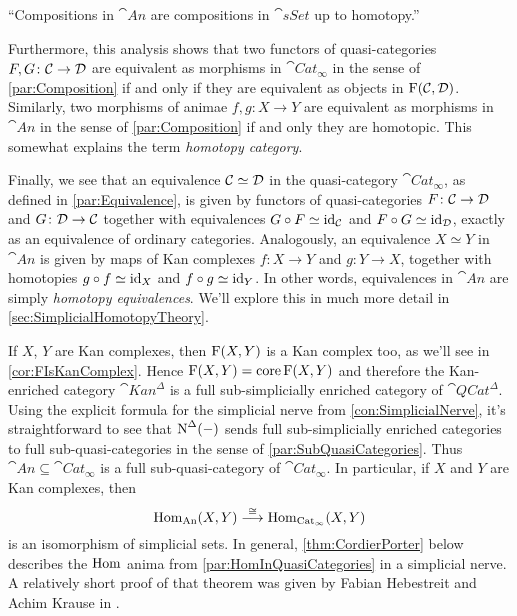 \begin{exm}
\begin{alphanumerate}[label={}]
		\item\enquote{Compositions in $\cat{An}$ are compositions in $\cat{sSet}$ up to homotopy.}
	\end{alphanumerate}
	Furthermore, this analysis shows that two functors of quasi-categories $F,G\colon \mathcal{C}\rightarrow \mathcal{D}$ are equivalent as morphisms in $\cat{Cat}_\infty$ in the sense of \cref{par:Composition} if and only if they are equivalent as objects in $\operatorname{F}(\mathcal{C},\mathcal{D})$. Similarly, two morphisms of animae $f,g\colon X\rightarrow Y$ are equivalent as morphisms in $\cat{An}$ in the sense of \cref{par:Composition} if and only they are homotopic. This somewhat explains the term \emph{homotopy category}.
	
	Finally, we see that an equivalence $\mathcal{C}\simeq \mathcal{D}$ in the quasi-category $\cat{Cat}_\infty$, as defined in \cref{par:Equivalence}, is given by functors of quasi-categories $F\colon \mathcal{C}\rightarrow \mathcal{D}$ and $G\colon \mathcal{D}\rightarrow \mathcal{C}$ together with equivalences $G\circ F\simeq \operatorname{id}_{\mathcal{C}}$ and $F\circ G\simeq \operatorname{id}_{\mathcal{D}}$, exactly as an equivalence of ordinary categories. Analogously, an equivalence $X\simeq Y$ in $\cat{An}$ is given by maps of Kan complexes $f\colon X\rightarrow Y$ and $g\colon Y\rightarrow X$, together with homotopies $g\circ f\simeq\operatorname{id}_X$ and $f\circ g\simeq \operatorname{id}_Y$. In other words, equivalences in $\cat{An}$ are simply \emph{homotopy equivalences}. We'll explore this in much more detail in \cref{sec:SimplicialHomotopyTheory}.
\end{exm}
If $X$, $Y$ are Kan complexes, then $\operatorname{F}(X,Y)$ is a Kan complex too, as we'll see in \cref{cor:FIsKanComplex}. Hence $\operatorname{F}(X,Y)=\operatorname{core}\operatorname{F}(X,Y)$ and therefore the Kan-enriched category $\cat{Kan}^\Delta$ is a full sub-simplicially enriched category of $\cat{QCat}^\Delta$. Using the explicit formula for the simplicial nerve from \cref{con:SimplicialNerve}, it's straightforward to see that $\operatorname{N}^\Delta(-)$ sends full sub-simplicially enriched categories to full sub-quasi-categories in the sense of \cref{par:SubQuasiCategories}. Thus $\cat{An}\subseteq \cat{Cat}_\infty$ is a full sub-quasi-category of $\cat{Cat}_\infty$. In particular, if $X$ and $Y$ are Kan complexes, then
\begin{equation*}
	\operatorname{Hom}_{\mathrm{An}}(X,Y)\overset{\cong}{\longrightarrow}\operatorname{Hom}_{\mathrm{Cat}_\infty}(X,Y)
\end{equation*}
is an isomorphism of simplicial sets. In general, \cref{thm:CordierPorter} below describes the $\operatorname{Hom}$ anima from \cref{par:HomInQuasiCategories} in a simplicial nerve. A relatively short proof of that theorem was given by Fabian Hebestreit and Achim Krause in \cite{AchimFabian}.

